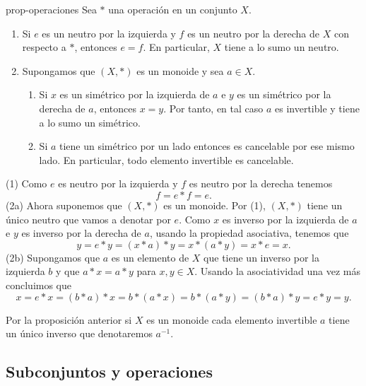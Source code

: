 \begin{proposition}{}{prop-operaciones}
    Sea $*$ una operación en un conjunto $X$.

    \begin{enumerate}
    
    \item Si $e$ es un neutro por la izquierda y $f$ es un neutro por la derecha de $X$ con respecto a $*$, entonces $e = f$. En particular, $X$ tiene a lo sumo un neutro.
    
    \item Supongamos que $(X, *)$ es un monoide y sea $a \in X$.
    \begin{enumerate}
        \item Si $x$ es un simétrico por la izquierda de $a$ e $y$ es un simétrico por la derecha de $a$, entonces $x = y$. Por tanto, en tal caso $a$ es invertible y tiene a lo sumo un simétrico.
        
        \item Si $a$ tiene un simétrico por un lado entonces es cancelable por ese mismo lado. En particular, todo elemento invertible es cancelable.
    \end{enumerate}
    \end{enumerate}
\end{proposition}

\begin{proofbox}
    (1) Como $e$ es neutro por la izquierda y $f$ es neutro por la derecha tenemos
    \[
    f = e * f = e.
    \]
    (2a) Ahora suponemos que $(X, *)$ es un monoide. Por (1), $(X, *)$ tiene un único neutro que vamos a denotar por $e$. Como $x$ es inverso por la izquierda de $a$ e $y$ es inverso por la derecha de $a$, usando la propiedad asociativa, tenemos que
    \[
    y = e * y = (x * a) * y = x * (a * y) = x * e = x.
    \]
    (2b) Supongamos que $a$ es un elemento de $X$ que tiene un inverso por la izquierda $b$ y que $a * x = a * y$ para $x, y \in X$. Usando la asociatividad una vez más concluimos que
    \[
    x = e * x = (b * a) * x = b * (a * x) = b * (a * y) = (b * a) * y = e * y = y.
    \]
\end{proofbox}

\begin{remark}
    Por la proposición anterior si $X$ es un monoide cada elemento invertible $a$ tiene un único inverso que denotaremos $a^{-1}$. 
\end{remark}

\subsection{Subconjuntos y operaciones}

